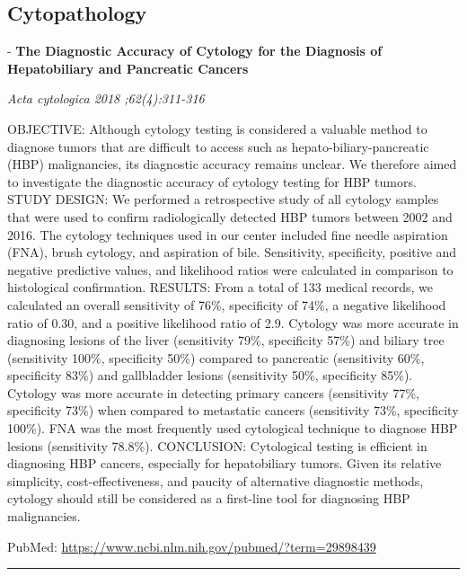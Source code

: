 \documentclass[]{article}
\begin{document}
\pagebreak

\hypertarget{cytopathology}{%
\subsection{Cytopathology}\label{cytopathology}}

 - \textbf{The Diagnostic Accuracy of Cytology for the Diagnosis of
Hepatobiliary and Pancreatic Cancers}

\emph{Acta cytologica 2018 ;62(4):311-316}

OBJECTIVE: Although cytology testing is considered a valuable method to
diagnose tumors that are difficult to access such as
hepato-biliary-pancreatic (HBP) malignancies, its diagnostic accuracy
remains unclear. We therefore aimed to investigate the diagnostic
accuracy of cytology testing for HBP tumors. STUDY DESIGN: We performed
a retrospective study of all cytology samples that were used to confirm
radiologically detected HBP tumors between 2002 and 2016. The cytology
techniques used in our center included fine needle aspiration (FNA),
brush cytology, and aspiration of bile. Sensitivity, specificity,
positive and negative predictive values, and likelihood ratios were
calculated in comparison to histological confirmation. RESULTS: From a
total of 133 medical records, we calculated an overall sensitivity of
76\%, specificity of 74\%, a negative likelihood ratio of 0.30, and a
positive likelihood ratio of 2.9. Cytology was more accurate in
diagnosing lesions of the liver (sensitivity 79\%, specificity 57\%) and
biliary tree (sensitivity 100\%, specificity 50\%) compared to
pancreatic (sensitivity 60\%, specificity 83\%) and gallbladder lesions
(sensitivity 50\%, specificity 85\%). Cytology was more accurate in
detecting primary cancers (sensitivity 77\%, specificity 73\%) when
compared to metastatic cancers (sensitivity 73\%, specificity 100\%).
FNA was the most frequently used cytological technique to diagnose HBP
lesions (sensitivity 78.8\%). CONCLUSION: Cytological testing is
efficient in diagnosing HBP cancers, especially for hepatobiliary
tumors. Given its relative simplicity, cost-effectiveness, and paucity
of alternative diagnostic methods, cytology should still be considered
as a first-line tool for diagnosing HBP malignancies.

PubMed: \url{https://www.ncbi.nlm.nih.gov/pubmed/?term=29898439}

{}

{}

\begin{center}\rule{0.5\linewidth}{\linethickness}\end{center}
\end{document}
